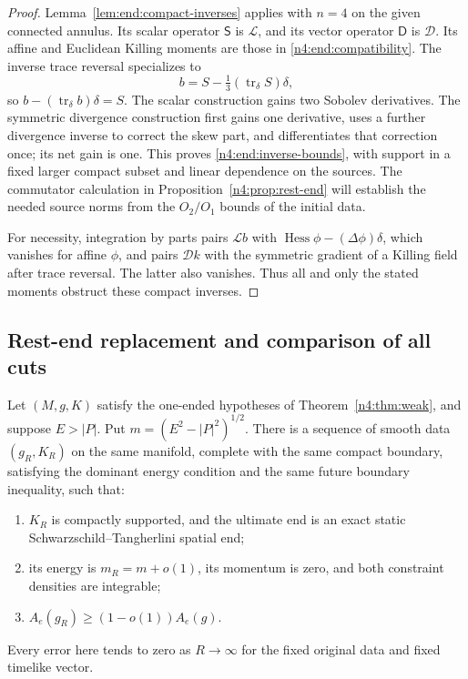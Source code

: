 \begin{proof}
Lemma~\ref{lem:end:compact-inverses} applies with $n=4$ on the given
connected annulus. Its scalar operator $\mathsf S$ is $\mathcal L$,
and its vector operator $\mathsf D$ is $\mathcal D$. Its affine and
Euclidean Killing moments are those in \eqref{n4:end:compatibility}.
The inverse trace reversal specializes to
\begin{equation}\label{n4:end:trace-inverse}
 b=S-\tfrac13(\operatorname{tr}_\delta S)\delta,
\end{equation}
so $b-(\operatorname{tr}_\delta b)\delta=S$.
The scalar construction gains two Sobolev derivatives. The symmetric
divergence construction first gains one derivative, uses a further
divergence inverse to correct the skew part, and differentiates that
correction once; its net gain is one. This proves
\eqref{n4:end:inverse-bounds}, with support in a fixed larger compact
subset and linear dependence on the sources. The commutator
calculation in Proposition~\ref{n4:prop:rest-end} will establish the
needed source norms from the $O_2/O_1$ bounds of the initial data.

For necessity, integration by parts pairs $\mathcal Lb$ with
$\operatorname{Hess}\phi-(\Delta\phi)\delta$, which vanishes for
affine $\phi$, and pairs $\mathcal Dk$ with the symmetric gradient
of a Killing field after trace reversal. The latter also vanishes.
Thus all and only the stated moments obstruct these compact inverses.
\end{proof}

\subsection{Rest-end replacement and comparison of all cuts}

\begin{proposition}\label{n4:prop:rest-end}
Let \((M,g,K)\) satisfy the one-ended hypotheses of
Theorem~\ref{n4:thm:weak}, and suppose \(E>|P|\). Put
\(m=(E^2-|P|^2)^{1/2}\). There is a sequence of smooth data
\((g_R,K_R)\) on the same manifold, complete with the same compact
boundary, satisfying the dominant energy condition and the same future
boundary inequality, such that:
\begin{enumerate}[label=\textup{(\roman*)}]
 \item \(K_R\) is compactly supported, and the ultimate end is an exact
 static Schwarzschild--Tangherlini spatial end;
 \item its energy is \(m_R=m+o(1)\), its momentum is zero, and both
 constraint densities are integrable;
 \item \(A_e(g_R)\ge(1-o(1))A_e(g)\).
\end{enumerate}
Every error here tends to zero as \(R\to\infty\) for the fixed original
data and fixed timelike vector.
\end{proposition}

